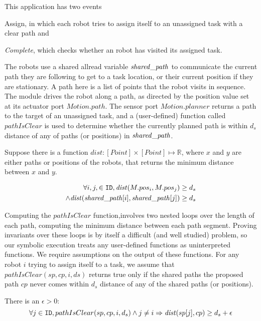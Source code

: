 This application has two events \begin{inparaenum} \item {Assign}, in which each robot tries to assign itself to an unassigned task with a clear path  and \item \emph{Complete}, which checks whether an robot has visited its assigned task. \end{inparaenum} The robots use a shared allread variable $\mathit{shared\_path}$ to communicate the current path they are following to get to a task location, or their current position if they are stationary. A path here is a list of points that the robot visits in sequence. The \Motion module drives the robot along a path, as directed by the position value set at its actuator port $\mathit{Motion.path}$. The sensor port $\mathit{Motion.planner}$ returns a path to the target of an unassigned task, and a (user-defined) function called $\mathit{pathIsClear}$ is used to determine whether the currently planned path is within $d_s$ distance of any of paths (or positions) in $\mathit{shared\_path}$.

\newcommand{\dist}{\mathit{dist}}
Suppose there is a function $\dist : [Point] \times [Point] \mapsto \mathbb{R}$, where $x$ and $y$ are either paths or positions of the robots, that returns the minimum distance between $x$ and $y$.
\begin{invariant}
\label{inv:task}
\[\begin{split}
    \forall i,j, \in \UINS, \dist(M.pos_i, M.pos_j) \geq d_s \\ \land \dist(\pathvar[i], \pathvar[j]) \geq d_s
\end{split}
\]
\end{invariant}
\noindent

Computing the $\mathit{pathIsClear}$ function,involves two nested loops over the length of each path, computing the minimum distance between each path segment. Proving invariants over these loops is by itself a difficult (and well studied) problem, so our symbolic execution treats any user-defined functions as uninterpreted functions. We require assumptions on the output of these functions. For any robot $i$ trying to assign itself to a task, we  assume that $\mathit{pathIsClear}(\mathit{sp}, \mathit{cp} ,i, \mathit{ds})$ returns true only if the shared paths the proposed path $\mathit{cp}$ never comes within $d_s$ distance of any of the shared paths (or positions).

\begin{assumption}
    \label{pathclear} There is an $\epsilon > 0$:
    $$\forall j \in \UINS, pathIsClear(sp, cp,  i, d_s) \wedge j \neq i \Rightarrow  \dist(sp[j], cp) \geq d_s + \epsilon$$
\end{assumption}

